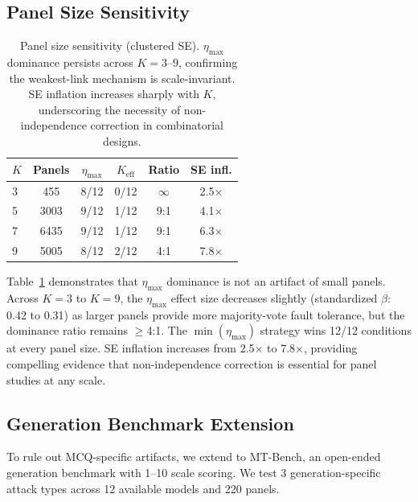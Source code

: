 \documentclass[11pt,a4paper]{article}
\begin{document}
\subsection{Panel Size Sensitivity}
\label{sec:panel_size}

\begin{table}[t]
\centering
\small
\begin{tabular}{lccccc}
\toprule
\textbf{$K$} & \textbf{Panels} & \textbf{$\eta_{\max}$} & \textbf{$K_{\text{eff}}$} & \textbf{Ratio} & \textbf{SE infl.} \\
\midrule
3 & 455 & 8/12 & 0/12 & $\infty$ & 2.5$\times$ \\
5 & 3003 & 9/12 & 1/12 & 9:1 & 4.1$\times$ \\
7 & 6435 & 9/12 & 1/12 & 9:1 & 6.3$\times$ \\
9 & 5005 & 8/12 & 2/12 & 4:1 & 7.8$\times$ \\
\bottomrule
\end{tabular}
\caption{Panel size sensitivity (clustered SE). $\eta_{\max}$ dominance persists across $K=3$--$9$, confirming the weakest-link mechanism is scale-invariant. SE inflation increases sharply with $K$, underscoring the necessity of non-independence correction in combinatorial designs.}
\label{tab:panel_size}
\end{table}

Table~\ref{tab:panel_size} demonstrates that $\eta_{\max}$ dominance is not an artifact of small panels. Across $K = 3$ to $K = 9$, the $\eta_{\max}$ effect size decreases slightly (standardized $\beta$: 0.42 to 0.31) as larger panels provide more majority-vote fault tolerance, but the dominance ratio remains $\geq$4:1. The $\min(\eta_{\max})$ strategy wins 12/12 conditions at every panel size. SE inflation increases from 2.5$\times$ to 7.8$\times$, providing compelling evidence that non-independence correction is essential for panel studies at any scale.

\subsection{Generation Benchmark Extension}
\label{sec:generation}

To rule out MCQ-specific artifacts, we extend to MT-Bench, an open-ended generation benchmark with 1--10 scale scoring. We test 3 generation-specific attack types across 12 available models and 220 panels.
\end{document}
